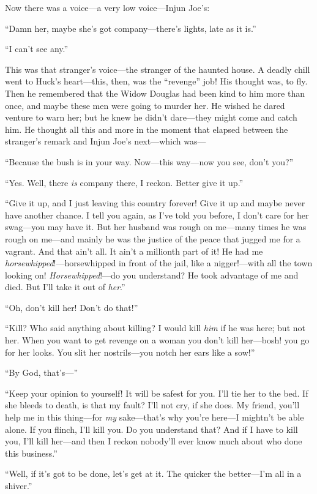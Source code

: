 \documentclass{book}
\begin{document}
Now there was a voice—a very low voice—Injun Joe’s:

“Damn her, maybe she’s got company—there’s lights, late as it is.”

“I can’t see any.”

This was that stranger’s voice—the stranger of the haunted house. A deadly chill went to Huck’s heart—this, then, was the “revenge” job! His thought was, to fly. Then he remembered that the Widow Douglas had been kind to him more than once, and maybe these men were going to murder her. He wished he dared venture to warn her; but he knew he didn’t dare—they might come and catch him. He thought all this and more in the moment that elapsed between the stranger’s remark and Injun Joe’s next—which was—

“Because the bush is in your way. Now—this way—now you see, don’t you?”

“Yes. Well, there \emph{is} company there, I reckon. Better give it up.”

“Give it up, and I just leaving this country forever! Give it up and maybe never have another chance. I tell you again, as I’ve told you before, I don’t care for her swag—you may have it. But her husband was rough on me—many times he was rough on me—and mainly he was the justice of the peace that jugged me for a vagrant. And that ain’t all. It ain’t a millionth part of it! He had me \emph{horsewhipped}!—horsewhipped in front of the jail, like a nigger!—with all the town looking on! \emph{Horsewhipped}!—do you understand? He took advantage of me and died. But I’ll take it out of \emph{her}.”

“Oh, don’t kill her! Don’t do that!”

“Kill? Who said anything about killing? I would kill \emph{him} if he was here; but not her. When you want to get revenge on a woman you don’t kill her—bosh! you go for her looks. You slit her nostrils—you notch her ears like a sow!”

“By God, that’s—”

“Keep your opinion to yourself! It will be safest for you. I’ll tie her to the bed. If she bleeds to death, is that my fault? I’ll not cry, if she does. My friend, you’ll help me in this thing—for \emph{my} sake—that’s why you’re here—I mightn’t be able alone. If you flinch, I’ll kill you. Do you understand that? And if I have to kill you, I’ll kill her—and then I reckon nobody’ll ever know much about who done this business.”

“Well, if it’s got to be done, let’s get at it. The quicker the better—I’m all in a shiver.”
\end{document}
